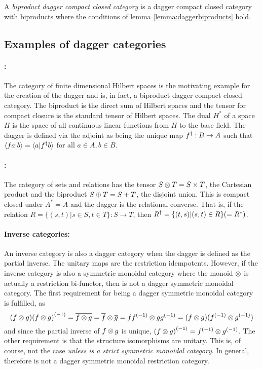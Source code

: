 \begin{definition} \label{def:biproductdaggerccc}
  A \emph{biproduct dagger compact closed category} is a dagger compact closed category with
  biproducts where the conditions of lemma \ref{lemma:daggerbiproducts} hold.
\end{definition}
\subsection{Examples of dagger categories}

\paragraph{\fdh{}:} The category of finite dimensional Hilbert spaces is the motivating example for
the creation of the dagger and is, in fact, a biproduct dagger compact closed category. The
biproduct is the direct sum of Hilbert spaces and the tensor for compact closure is the standard
tensor of Hilbert spaces. The dual $H^{*}$ of a space $H$ is the space of all continuous linear
functions from $H$ to the base field. The dagger is defined via the adjoint as being the unique map
${f}^{\dagger}:B\to A$ such that $\langle f a|b\rangle = \langle a | {f}^{\dagger} b\rangle$ for all $a\in A, b\in B$.

\paragraph{\rel{}:} The category \rel of sets and relations has the tensor $S\otimes T = S\times T$, the
Cartesian product and the biproduct $S\oplus T = S+T$, the disjoint union. This is compact closed under
$A^{*} = A$ and the dagger is the relational converse. That is, if the relation $R=\{(s,t)|s\in S,
t\in T\}:S\to T$, then ${R}^{\dagger}=\{(t,s)|(s,t)\in R\}(=R^{*})$.

\paragraph{Inverse categories:}
An inverse category \X is also a dagger category when the dagger is defined as the partial inverse.
The unitary maps are the restriction idempotents. However, if the inverse category \X is also a
symmetric monoidal category where the monoid $\otimes$ is actually a restriction bi-functor, then \X is
not a dagger symmetric monoidal category. The first requirement for being a dagger symmetric
monoidal category is fulfilled, as
\[
  (f\otimes g) {(f\otimes g)}^{(-1)} = \overline{f\otimes g}=\overline{f} \otimes\overline{g} =
   f{f}^{(-1)} \otimes g {g}^{(-1)} = (f\otimes g) ({f}^{(-1)} \otimes {g}^{(-1)})
\]
and since the partial inverse of $f\otimes g$ is unique, ${(f\otimes g)}^{(-1)} = {f}^{(-1)} \otimes {g}^{(-1)}$. The other
requirement is that the structure isomorphisms are unitary. This is, of course, not the case
\emph{unless \X is a strict symmetric monoidal category}. In general,
therefore \X is not a dagger symmetric monoidal restriction category.

